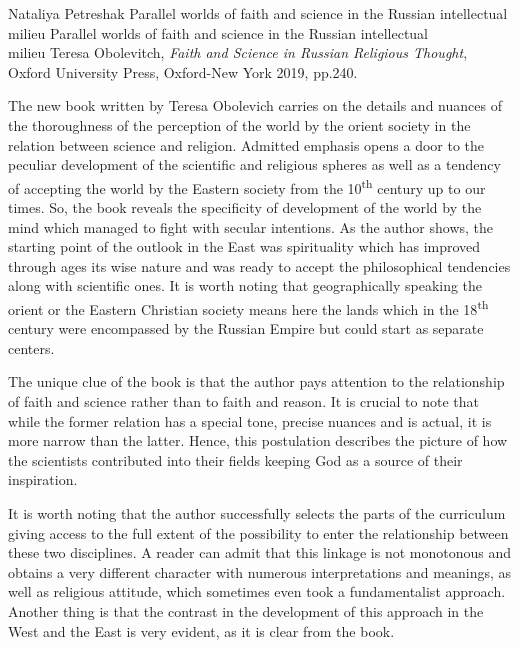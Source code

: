 \begin{recplenv}{Nataliya Petreshak}
	{Parallel worlds of faith and science in the Russian intellectual milieu}
	{Parallel worlds of faith and science in the Russian intellectual\\milieu}
	{Teresa Obolevitch, \textit{Faith and Science in Russian Religious Thought}, Oxford University Press, Oxford-New York 2019,
		pp.240.}
 





The new book written by Teresa Obolevich carries on the details and nuances of the thoroughness of the
perception of the world by the orient society in the relation between science and religion. Admitted emphasis opens a door
to the peculiar development of the scientific and religious spheres as well as a tendency of accepting the world by the
Eastern society from the 10\textsuperscript{th} century up to our times. So, the book reveals
the specificity of development of the world by the mind which managed to fight with secular intentions. As the author
shows, the starting point of the outlook in the East was spirituality which has improved through ages its wise
nature and was ready to accept the philosophical tendencies along with scientific ones. It is worth noting
that geographically speaking
the orient or the Eastern Christian society means here the lands which in the
18\textsuperscript{th} century were encompassed by the Russian Empire but could start as separate centers.


The unique clue of the book is that the author pays attention to the relationship of faith and science rather than to faith and
reason. It is crucial to note that while the former relation has a special tone, precise nuances and is actual,
it is more narrow than the latter. Hence, this postulation describes the picture of how the scientists
contributed into their fields keeping God as a source of their inspiration.


It is worth noting that the author successfully selects the parts of the curriculum giving access to the full extent
of the possibility to enter the relationship between these two disciplines. A reader can admit that this linkage is not
monotonous and obtains a very different character with numerous interpretations and meanings, as well as religious
attitude, which sometimes even took a fundamentalist approach. Another thing is that
the contrast in the development of this approach in the West and the East
is very evident, as it is clear from the book.



\end{recplenv}
